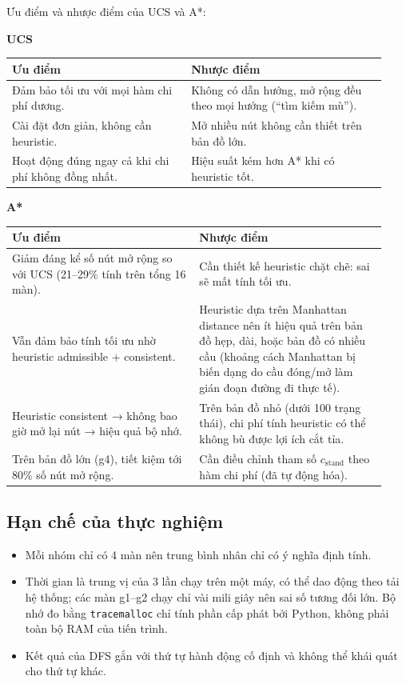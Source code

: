 Ưu điểm và nhược điểm của UCS và A*:

\textbf{UCS}

{\renewcommand{\arraystretch}{1.25}
\begin{longtable}{|>{\raggedright\arraybackslash}p{0.447\linewidth}|>{\raggedright\arraybackslash}p{0.483\linewidth}|}
\hline
\textbf{Ưu điểm} & \textbf{Nhược điểm} \\ \hline
\endhead
\hline
\endlastfoot
Đảm bảo tối ưu với mọi hàm chi phí dương. & Không có dẫn hướng, mở rộng đều theo mọi hướng (``tìm kiếm mù''). \\ \hline
Cài đặt đơn giản, không cần heuristic. & Mở nhiều nút không cần thiết trên bản đồ lớn. \\ \hline
Hoạt động đúng ngay cả khi chi phí không đồng nhất. & Hiệu suất kém hơn A* khi có heuristic tốt. \\
\end{longtable}
}

\textbf{A*}

{\renewcommand{\arraystretch}{1.25}
\begin{longtable}{|>{\raggedright\arraybackslash}p{0.465\linewidth}|>{\raggedright\arraybackslash}p{0.465\linewidth}|}
\hline
\textbf{Ưu điểm} & \textbf{Nhược điểm} \\ \hline
\endhead
\hline
\endlastfoot
Giảm đáng kể số nút mở rộng so với UCS (21–29\% tính trên tổng 16 màn). & Cần thiết kế heuristic chặt chẽ: sai sẽ mất tính tối ưu. \\ \hline
Vẫn đảm bảo tính tối ưu nhờ heuristic admissible + consistent. & Heuristic dựa trên Manhattan distance nên ít hiệu quả trên bản đồ hẹp, dài, hoặc bản đồ có nhiều cầu (khoảng cách Manhattan bị biến dạng do cầu đóng/mở làm gián đoạn đường đi thực tế). \\ \hline
Heuristic consistent → không bao giờ mở lại nút → hiệu quả bộ nhớ. & Trên bản đồ nhỏ (dưới 100 trạng thái), chi phí tính heuristic có thể không bù được lợi ích cắt tỉa. \\ \hline
Trên bản đồ lớn (g4), tiết kiệm tới 80\% số nút mở rộng. & Cần điều chỉnh tham số $c_{\text{stand}}$ theo hàm chi phí (đã tự động hóa). \\
\end{longtable}
}

\subsection{Hạn chế của thực nghiệm}

\begin{itemize}
\item Mỗi nhóm chỉ có 4 màn nên trung bình nhân chỉ có ý nghĩa định tính.
\item Thời gian là trung vị của 3 lần chạy trên một máy, có thể dao động theo tải hệ thống; các màn g1–g2 chạy chỉ vài mili giây nên sai số tương đối lớn. Bộ nhớ đo bằng \texttt{tracemalloc} chỉ tính phần cấp phát bởi Python, không phải toàn bộ RAM của tiến trình.
\item Kết quả của DFS gắn với thứ tự hành động cố định và không thể khái quát cho thứ tự khác.
\end{itemize}
